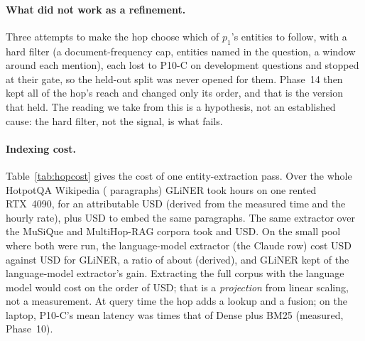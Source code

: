 \paragraph{What did not work as a refinement.} Three attempts to make the hop choose which of
$p_1$'s entities to follow, with a hard filter (a document-frequency cap, entities named in the
question, a window around each mention), each lost to P10-C on development questions and stopped
at their gate, so the held-out split was never opened for them. Phase~14 then kept all of the
hop's reach and changed only its order, and that is the version that held. The reading we take
from this is a hypothesis, not an established cause: the hard filter, not the signal, is what
fails.

\begin{table}[t]
\centering
\small
\caption{\capHopCost}
\label{tab:hopcost}
\end{table}

\paragraph{Indexing cost.} Table~\ref{tab:hopcost} gives the cost of one entity-extraction
pass. Over the whole HotpotQA Wikipedia (\hopCostNineUnits{} paragraphs) GLiNER took
\hopCostNineHours{} hours on one rented RTX~4090, for an attributable \hopCostNineUsd{} USD
(derived from the measured time and the hourly rate), plus \hopCostNineEmbedUsd{} USD to embed
the same paragraphs. The same extractor over the MuSiQue and MultiHop-RAG corpora took
\hopCostFifteenUsd{} and \hopCostSixteenUsd{} USD. On the small pool where both were run,
the language-model extractor (the Claude row) cost \phSevenClaudeUsd{} USD against \phSevenGlinerUsd{}
USD for GLiNER, a ratio of about \phSevenCostRatio{} (derived), and GLiNER kept \phSevenRetention{}
of the language-model extractor's gain. Extracting the full corpus with the language model would
cost on the order of \phSevenClaudeProjectedUsd{} USD; that is a \emph{projection} from linear
scaling, not a measurement. At query time the hop adds a lookup and a fusion; on the laptop,
P10-C's mean latency was \phTenLatencyRatio{} times that of Dense plus BM25 (measured, Phase~10).

